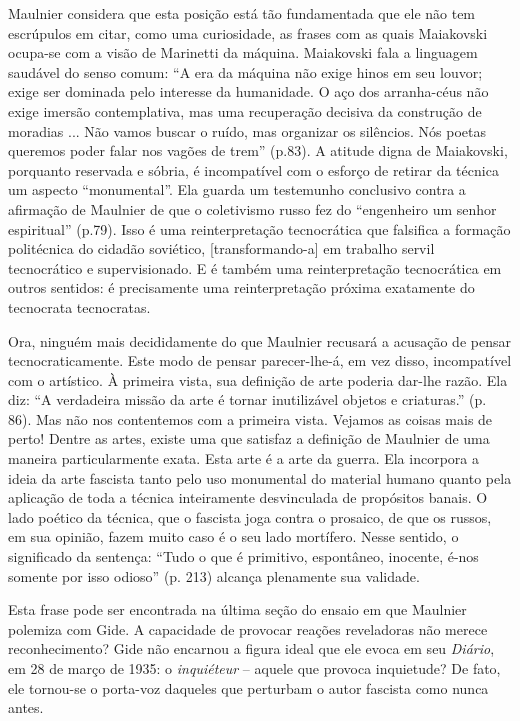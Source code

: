Maulnier considera que esta posição está tão fundamentada que ele não
tem escrúpulos em citar, como uma curiosidade, as frases com as quais
Maiakovski ocupa-se com a visão de Marinetti da máquina. Maiakovski fala
a linguagem saudável do senso comum: ``A era da máquina não exige hinos
em seu louvor; exige ser dominada pelo interesse da humanidade. O aço
dos arranha-céus não exige imersão contemplativa, mas uma recuperação
decisiva da construção de moradias ... Não vamos buscar o ruído, mas
organizar os silêncios. Nós poetas queremos poder falar nos vagões de
trem'' (p.83). A atitude digna de Maiakovski, porquanto reservada e
sóbria, é incompatível com o esforço de retirar da técnica um aspecto
``monumental''. Ela guarda um testemunho conclusivo contra a afirmação
de Maulnier de que o coletivismo russo fez do ``engenheiro um senhor
espiritual'' (p.79). Isso é uma reinterpretação tecnocrática que
falsifica a formação politécnica do cidadão soviético,
{[}transformando-a{]} em trabalho servil tecnocrático e supervisionado.
E é também uma reinterpretação tecnocrática em outros sentidos: é
precisamente uma reinterpretação próxima exatamente do tecnocrata
tecnocratas.

Ora, ninguém mais decididamente do que Maulnier recusará a acusação de
pensar tecnocraticamente. Este modo de pensar parecer-lhe-á, em vez
disso, incompatível com o artístico. À primeira vista, sua definição de
arte poderia dar-lhe razão. Ela diz: ``A verdadeira missão da arte é
tornar inutilizável objetos e criaturas.'' (p. 86). Mas não nos
contentemos com a primeira vista. Vejamos as coisas mais de perto!
Dentre as artes, existe uma que satisfaz a definição de Maulnier de uma
maneira particularmente exata. Esta arte é a arte da guerra. Ela
incorpora a ideia da arte fascista tanto pelo uso monumental do material
humano quanto pela aplicação de toda a técnica inteiramente desvinculada
de propósitos banais. O lado poético da técnica, que o fascista joga
contra o prosaico, de que os russos, em sua opinião, fazem muito caso é
o seu lado mortífero. Nesse sentido, o significado da sentença: ``Tudo o
que é primitivo, espontâneo, inocente, é-nos somente por isso odioso''
(p. 213) alcança plenamente sua validade.

Esta frase pode ser encontrada na última seção do ensaio em que Maulnier
polemiza com Gide. A capacidade de provocar reações reveladoras não
merece reconhecimento? Gide não encarnou a figura ideal que ele evoca em
seu \emph{Diário}, em 28 de março de 1935: o \emph{inquiéteur} -- aquele
que provoca inquietude? De fato, ele tornou-se o porta-voz daqueles que
perturbam o autor fascista como nunca antes.

